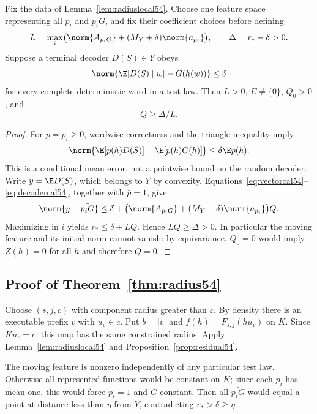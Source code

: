 \begin{proposition}\label{prop:residual54}
Fix the data of Lemma~\ref{lem:radiuslocal54}. Choose one feature space representing all $p_i$ and $p_iG$, and fix their coefficient choices before defining
\[
 L=\max_i\bigl(\norm{A_{p_iG}}+(M_Y+\delta)\norm{a_{p_i}}\bigr),
 \qquad \Delta=r_*-\delta>0.
\]
Suppose a terminal decoder $D(S)\in Y$ obeys
\[
 \norm{\E[D(S)\mid w]-G(h(w))}\le\delta
\]
for every complete deterministic word in a test law. Then $L>0$, $E\ne\{0\}$, $Q_0>0$, and
\begin{equation}\label{eq:residual54}
                         Q\ge\Delta/L.
\end{equation}
\end{proposition}
\begin{proof}
For $p=p_i\ge0$, wordwise correctness and the triangle inequality imply
\[
 \norm{\E[p(h)D(S)]-\E[p(h)G(h)]}\le\delta\E p(h).
\]
This is a conditional mean error, not a pointwise bound on the random decoder. Write $y=\E D(S)$, which belongs to $Y$ by convexity. Equations~\eqref{eq:vectorcal54}--\eqref{eq:decodercal54}, together with $\bar p=1$, give
\[
 \norm{y-\bar{p_iG}}\le\delta+
 \bigl(\norm{A_{p_iG}}+(M_Y+\delta)\norm{a_{p_i}}\bigr)Q.
\]
Maximizing in $i$ yields $r_*\le\delta+LQ$. Hence $LQ\ge\Delta>0$. In particular the moving feature and its initial norm cannot vanish: by equivariance, $Q_0=0$ would imply $Z(h)=0$ for all $h$ and therefore $Q=0$.
\end{proof}

\subsection{Proof of Theorem~\ref{thm:radius54}}
Choose $(s,j,c)$ with component radius greater than $\varepsilon$. By density there is an executable prefix $v$ with $u_v\in c$. Put $b=|v|$ and $f(h)=F_{s,j}(hu_v)$ on $K$. Since $Ku_v=c$, this map has the same constrained radius. Apply Lemma~\ref{lem:radiuslocal54} and Proposition~\ref{prop:residual54}.

The moving feature is nonzero independently of any particular test law. Otherwise all represented functions would be constant on $K$; since each $p_i$ has mean one, this would force $p_i=1$ and $G$ constant. Then all $\bar{p_iG}$ would equal a point at distance less than $\eta$ from $Y$, contradicting $r_*>\delta\ge\eta$.

